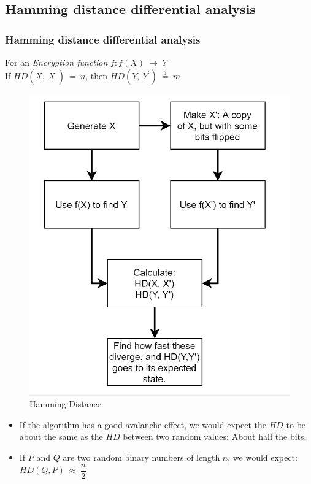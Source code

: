 \subsection{Hamming distance differential analysis}

\begin{frame}
\frametitle{Hamming distance differential analysis}
For an \textit{Encryption function }$f : f(X) \ \rightarrow \ Y$ \\
If $HD(X, \ X^\prime) \ = \ n$, then $HD(Y, \ Y^\prime) \ \stackrel{?}{=} \ m$
\setlength{\columnsep}{-30pt}
\begin{multicols}{2}
\setlength{\leftmargin}{1pt}
\begin{figure}
    \includegraphics[scale=0.25]{HD.png}
    \tiny{\caption{Hamming Distance}}
\end{figure}
\columnbreak
\begin{itemize}
    \item If the algorithm has a good avalanche effect, we would expect the $HD$ to be about the same as the $HD$ between two random values: About half the bits.
    \item If $P$ and $Q$ are two random binary numbers of length $n$, we would expect: $HD(Q,P) \ \approx \ \dfrac{n}{2}$
\end{itemize}
\end{multicols}
\end{frame}